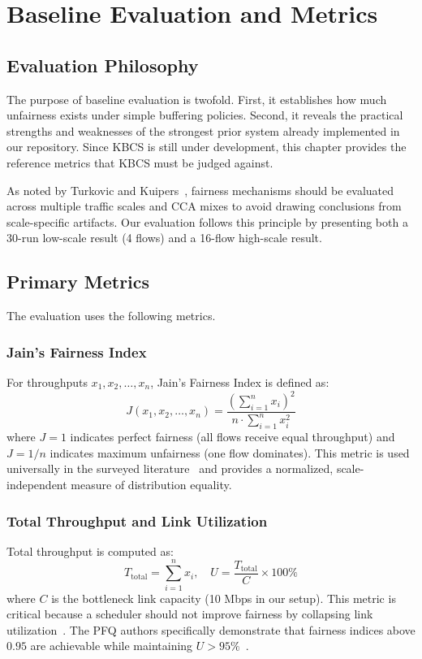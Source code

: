 \documentclass[12pt,a4paper]{report}
\begin{document}
\chapter{Baseline Evaluation and Metrics}

\section{Evaluation Philosophy}
The purpose of baseline evaluation is twofold. First, it establishes how much unfairness exists under simple buffering policies. Second, it reveals the practical strengths and weaknesses of the strongest prior system already implemented in our repository. Since KBCS is still under development, this chapter provides the reference metrics that KBCS must be judged against.

As noted by Turkovic and Kuipers~\cite{p4air}, fairness mechanisms should be evaluated across multiple traffic scales and CCA mixes to avoid drawing conclusions from scale-specific artifacts. Our evaluation follows this principle by presenting both a 30-run low-scale result (4 flows) and a 16-flow high-scale result.

\section{Primary Metrics}
The evaluation uses the following metrics.

\subsection{Jain's Fairness Index}
For throughputs $x_1, x_2, \ldots, x_n$, Jain's Fairness Index is defined as:
\[
J(x_1, x_2, \ldots, x_n) = \frac{\left(\sum_{i=1}^{n} x_i\right)^2}{n \cdot \sum_{i=1}^{n} x_i^2}
\]
where $J=1$ indicates perfect fairness (all flows receive equal throughput) and $J=1/n$ indicates maximum unfairness (one flow dominates). This metric is used universally in the surveyed literature~\cite{p4air, buffermgmt, pfq, ccaaware} and provides a normalized, scale-independent measure of distribution equality.

\subsection{Total Throughput and Link Utilization}
Total throughput is computed as:
\[
T_{\text{total}} = \sum_{i=1}^{n} x_i, \quad U = \frac{T_{\text{total}}}{C} \times 100\%
\]
where $C$ is the bottleneck link capacity (10 Mbps in our setup). This metric is critical because a scheduler should not improve fairness by collapsing link utilization~\cite{pfq}. The PFQ authors specifically demonstrate that fairness indices above $0.95$ are achievable while maintaining $U > 95\%$~\cite{pfq}.
\end{document}
